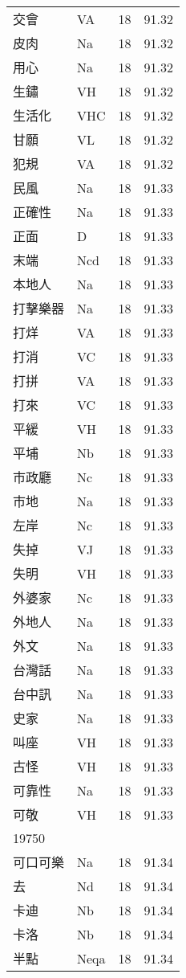 \documentclass[twocolumn]{book}
\begin{document}
\begin{supertabular}{llrr}
交會 & VA & 18 &  91.32\\
皮肉 & Na & 18 &  91.32\\
用心 & Na & 18 &  91.32\\
生鏽 & VH & 18 &  91.32\\
生活化 & VHC & 18 &  91.32\\
甘願 & VL & 18 &  91.32\\
犯規 & VA & 18 &  91.32\\
民風 & Na & 18 &  91.33\\
正確性 & Na & 18 &  91.33\\
正面 & D & 18 &  91.33\\
末端 & Ncd & 18 &  91.33\\
本地人 & Na & 18 &  91.33\\
打擊樂器 & Na & 18 &  91.33\\
打烊 & VA & 18 &  91.33\\
打消 & VC & 18 &  91.33\\
打拼 & VA & 18 &  91.33\\
打來 & VC & 18 &  91.33\\
平緩 & VH & 18 &  91.33\\
平埔 & Nb & 18 &  91.33\\
市政廳 & Nc & 18 &  91.33\\
市地 & Na & 18 &  91.33\\
左岸 & Nc & 18 &  91.33\\
失掉 & VJ & 18 &  91.33\\
失明 & VH & 18 &  91.33\\
外婆家 & Nc & 18 &  91.33\\
外地人 & Na & 18 &  91.33\\
外文 & Na & 18 &  91.33\\
台灣話 & Na & 18 &  91.33\\
台中訊 & Na & 18 &  91.33\\
史家 & Na & 18 &  91.33\\
叫座 & VH & 18 &  91.33\\
古怪 & VH & 18 &  91.33\\
可靠性 & Na & 18 &  91.33\\
可敬 & VH & 18 &  91.33\\
19750\\
可口可樂 & Na & 18 &  91.34\\
去 & Nd & 18 &  91.34\\
卡迪 & Nb & 18 &  91.34\\
卡洛 & Nb & 18 &  91.34\\
半點 & Neqa & 18 &  91.34\\

\end{supertabular}
\end{document}
